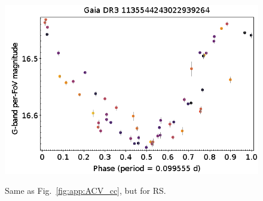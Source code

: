 \documentclass[longauth]{aa}
\begin{document}
\begin{appendix}
\begin{figure}
\hspace{2mm}
 \includegraphics[width=0.45\hsize]{figures/appendix/RS-97.png} \\
\vspace{4mm}
 \caption{Same as Fig.~\ref{fig:app:ACV_cc}, but for RS.}
 \label{fig:app:RS_cc}
\end{figure}




\end{appendix}
\end{document}

